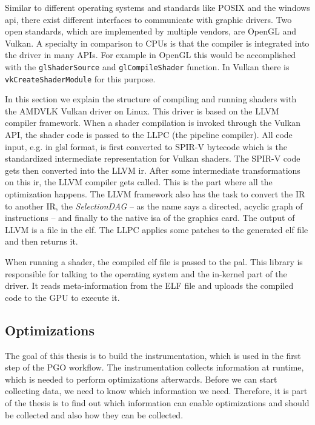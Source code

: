 Similar to different operating systems and standards like POSIX and the windows \gls{api}, there exist different interfaces to communicate with graphic drivers. Two open standards, which are implemented by multiple vendors, are OpenGL and Vulkan. A specialty in comparison to CPUs is that the compiler is integrated into the driver in many APIs. For example in OpenGL this would be accomplished with the \texttt{glShaderSource} and \texttt{glCompileShader} function. In Vulkan there is \texttt{vkCreateShaderModule} for this purpose.

In this section we explain the structure of compiling and running shaders with the AMDVLK Vulkan driver on Linux. This driver is based on the LLVM compiler framework. When a shader compilation is invoked through the Vulkan API, the shader code is passed to the LLPC (the pipeline compiler). All code input, e.g. in \gls{glsl} format, is first converted to SPIR-V bytecode which is the standardized intermediate representation for Vulkan shaders. The SPIR-V code gets then converted into the LLVM \gls{ir}. After some intermediate transformations on this \gls{ir}, the LLVM compiler gets called. This is the part where all the optimization happens. The LLVM framework also has the task to convert the IR to another IR, the \emph{SelectionDAG} -- as the name says a directed, acyclic graph of instructions -- and finally to the native \gls{isa} of the graphics card. The output of LLVM is a file in the \gls{elf}. The LLPC applies some patches to the generated \gls{elf} file and then returns it.

When running a shader, the compiled \gls{elf} file is passed to the \gls{pal}. This library is responsible for talking to the operating system and the in-kernel part of the driver. It reads meta-information from the ELF file and uploads the compiled code to the GPU to execute it.

\subsection{Optimizations}
The goal of this thesis is to build the instrumentation, which is used in the first step of the PGO workflow. The instrumentation collects information at runtime, which is needed to perform optimizations afterwards. Before we can start collecting data, we need to know which information we need. Therefore, it is part of the thesis is to find out which information can enable optimizations and should be collected and also how they can be collected.


